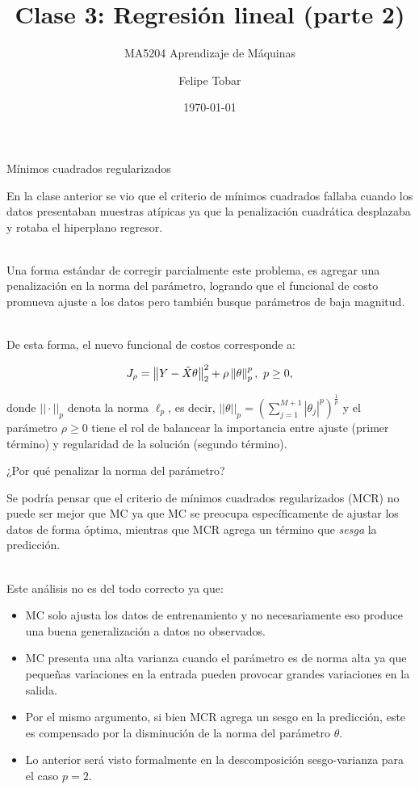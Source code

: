 \documentclass[handout, 9pt]{beamer}
\title{Clase 3: Regresión lineal (parte 2)}
\subtitle{MA5204 Aprendizaje de Máquinas}
\date{\today}
\author{Felipe Tobar}
\institute{Department of Mathematical Engineering \&\\ Center for Mathematical Modelling\\Universidad de Chile}
\begin{document}
\begin{frame}
  \titlepage
\end{frame}

\begin{frame}{Mínimos cuadrados regularizados}

En la clase anterior se vio que el criterio de mínimos cuadrados fallaba cuando los datos presentaban muestras atípicas ya que la penalización cuadrática desplazaba y rotaba el hiperplano regresor.\\~\ \pause

Una forma estándar de corregir parcialmente este problema, es agregar una penalización en la norma del parámetro, logrando que el funcional de costo promueva ajuste a los datos pero también busque parámetros de baja magnitud.\\~\ \pause

De esta forma, el nuevo funcional de costos corresponde a:

\begin{equation*}
	J_\rho = \left\lVert Y-\tilde{X}\theta\right\rVert_2^2 + \rho\left\lVert\theta\right\rVert_p^p,\ p\geq 0,
\end{equation*}

donde $||\cdot||_p$ denota la norma $\ell_p$, es decir, $||\theta||_p=\left(\sum\limits_{j=1}^{M+1}|\theta_j|^p\right)^\frac{1}{p}$ y el parámetro $\rho\geq0$ tiene el rol de balancear la importancia entre ajuste (primer término) y regularidad de la solución (segundo término).
	 
\end{frame}

\begin{frame}{¿Por qué penalizar la norma del parámetro?}

Se podría pensar que el criterio de mínimos cuadrados regularizados (MCR) no puede ser mejor que MC ya que MC se preocupa específicamente de ajustar los datos de forma óptima, mientras que MCR agrega un término que \emph{sesga} la predicción.\\~\ \pause

Este análisis no es del todo correcto ya que: 

\begin{itemize}
	\item MC solo ajusta los datos de entrenamiento y no necesariamente eso produce una buena generalización a datos no observados.\pause
	\item MC presenta una alta varianza cuando el parámetro es de norma alta ya que pequeñas variaciones en la entrada pueden provocar grandes variaciones en la salida.\pause
	\item Por el mismo argumento, si bien MCR agrega un sesgo en la predicción, este es compensado por la disminución de la norma del parámetro $\theta$.\pause
	\item Lo anterior será visto formalmente en la descomposición sesgo-varianza para el caso $p=2$.
\end{itemize}
	
\end{frame}
\end{document}
